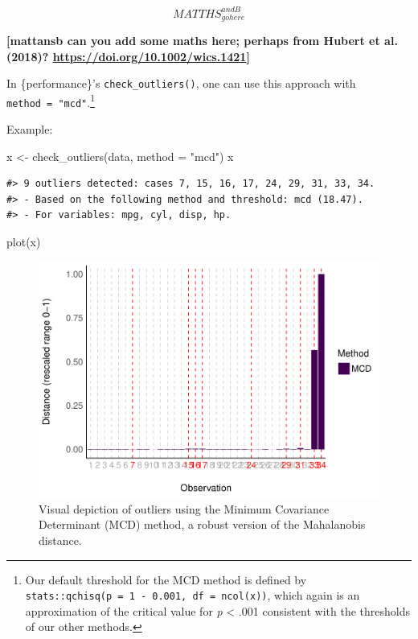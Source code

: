 \documentclass[
]{article}
\newenvironment{Shaded}{\begin{snugshade}}{\end{snugshade}}
\newcommand{\AttributeTok}[1]{\textcolor[rgb]{0.77,0.63,0.00}{#1}}
\newcommand{\FunctionTok}[1]{\textcolor[rgb]{0.00,0.00,0.00}{#1}}
\newcommand{\NormalTok}[1]{#1}
\newcommand{\OtherTok}[1]{\textcolor[rgb]{0.56,0.35,0.01}{#1}}
\newcommand{\StringTok}[1]{\textcolor[rgb]{0.31,0.60,0.02}{#1}}
\begin{document}
\[
MATTHS_{gohere}^{andB}
\]

\textbf{{[}mattansb can you add some maths here; perhaps from Hubert et al. (2018)? \url{https://doi.org/10.1002/wics.1421}{]}}

In \{performance\}'s \texttt{check\_outliers()}, one can use this approach with \texttt{method\ =\ "mcd"}.\footnote{Our default threshold for the MCD method is defined by \texttt{stats::qchisq(p\ =\ 1\ -\ 0.001,\ df\ =\ ncol(x))}, which again is an approximation of the critical value for \emph{p} \textless{} .001 consistent with the thresholds of our other methods.}

Example:



\begin{Shaded}
\begin{Highlighting}[]
\NormalTok{x }\OtherTok{\textless{}{-}} \FunctionTok{check\_outliers}\NormalTok{(data, }\AttributeTok{method =} \StringTok{"mcd"}\NormalTok{)}
\NormalTok{x}
\end{Highlighting}
\end{Shaded}

\begin{verbatim}
#> 9 outliers detected: cases 7, 15, 16, 17, 24, 29, 31, 33, 34.
#> - Based on the following method and threshold: mcd (18.47).
#> - For variables: mpg, cyl, disp, hp.
\end{verbatim}

\begin{Shaded}
\begin{Highlighting}[]
\FunctionTok{plot}\NormalTok{(x)}
\end{Highlighting}
\end{Shaded}

\begin{figure}
\includegraphics[width=1\linewidth]{paper_files/figure-latex/multivariate-1} \caption{Visual depiction of outliers using the Minimum Covariance Determinant (MCD) method, a robust version of the Mahalanobis distance.}\label{fig:multivariate}
\end{figure}
\end{document}
